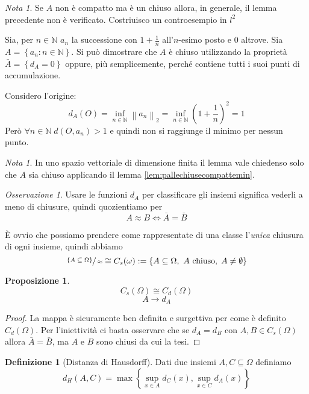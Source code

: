 \documentclass[a4paper,10pt]{article}
\newcounter{counter1}
\theoremstyle{plain}
\newtheorem{mypro}[counter1]{Proposizione}
\theoremstyle{definition}
\newtheorem{mydef}[counter1]{Definizione}
\theoremstyle{remark}
\newtheorem{mynot}[counter1]{Nota}
\newtheorem{myoss}[counter1]{Osservazione}
\newcommand{\set}[1]{\left\{#1\right\}}
\newcommand{\pa}[1]{\left(#1\right)}
\newcommand{\norm}[1]{\left\|#1\right\|}
\begin{document}
\begin{mynot}
  Se $A$ non è compatto ma è un chiuso allora, in generale, il lemma
  precedente non è verificato. Costriuisco un controesempio in $l^2$
  
  Sia, per $n\in \mathbb{N}$ $a_n$ la successione con $1+\frac{1}{n}$
  all'$n$-esimo posto e $0$ altrove. Sia $A = \set{a_n : n\in
    \mathbb{N}}$. Si pu\`o dimostrare che $A$ \`e chiuso utilizzando
  la propriet\`a $\bar A = \set {d_A = 0}$ oppure, più semplicemente,
  perché contiene tutti i suoi punti di accumulazione.

  Considero l'origine:
  \[ d_A(O) = \inf _{n\in \mathbb{N}} \norm{a_n}_2 = \inf _{n\in
    \mathbb{N}} \pa{1+\frac{1}{n}}^2 = 1 \]
  Però $\forall n\in \mathbb{N}\; d(O,a_n) > 1$ e quindi non si
  raggiunge il minimo per nessun punto.  
\end{mynot}

\begin{mynot}
  In uno spazio vettoriale di dimensione finita il lemma vale
  chiedenso solo che $A$ sia chiuso applicando il lemma
  \ref{lem:pallechiusecompattemin}.
\end{mynot}


\begin{myoss}
  Usare le funzioni $d_A$ per classificare gli insiemi significa
  vederli a meno di chiusure, quindi quozientiamo per
  \[ A \approx B \Leftrightarrow \bar A = \bar B \] 

  È ovvio che possiamo prendere come rappresentate di una classe
  l'\textit{unica} chiusura di ogni insieme, quindi abbiamo
  \[ \sfrac{\set{A \subseteq \Omega}}{\approx} \cong C_s(\omega) := \set{A
    \subseteq \Omega,\ A\text{ chiuso},\; A\neq \emptyset} \]
\end{myoss}
\begin{mypro}
  \[ C_s(\Omega) \cong C_d(\Omega) \]
  \[ A \rightarrow d_A \]
\end{mypro}
\begin{proof}
  La mappa è sicuramente ben definita e surgettiva per come è definito
  $C_d(\Omega)$. Per l'iniettività ci basta osservare che se $d_A =
  d_B$ con $A,B \in C_s(\Omega)$ allora $\bar A = \bar B$, ma $A$ e $B$
  sono chiusi da cui la tesi.
\end{proof}



\begin{mydef}[Distanza di Hausdorff]
  Dati due insiemi $A,C \subseteq \Omega$ definiamo
%
  \[ d_H(A,C) = \max \set{\sup _{x\in A} d_C (x) , \sup _{x\in C} d_A
    (x) } \]
\end{mydef}
\end{document}

